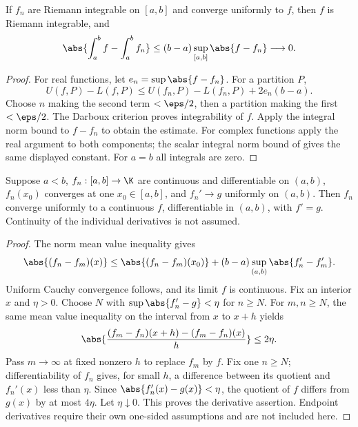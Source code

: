 \begin{theorem}
If $f_n$ are Riemann integrable on $[a,b]$ and converge uniformly to $f$, then $f$ is Riemann integrable, and
\[\abs{\int_a^b f-\int_a^b f_n}\leq(b-a)\sup_{[a,b]}\abs{f-f_n}\longrightarrow0.\]
\end{theorem}
\begin{proof}
For real functions, let $e_n=\sup\abs{f-f_n}$. For a partition $P$,
\[U(f,P)-L(f,P)\leq U(f_n,P)-L(f_n,P)+2e_n(b-a).\]
Choose $n$ making the second term $<\eps/2$, then a partition making the first $<\eps/2$. The Darboux criterion proves integrability of $f$. Apply the integral norm bound to $f-f_n$ to obtain the estimate. For complex functions apply the real argument to both components; the scalar integral norm bound of  gives the same displayed constant. For $a=b$ all integrals are zero.
\end{proof}

\begin{theorem}
Suppose $a<b$, $f_n:[a,b]\to\K$ are continuous and differentiable on $(a,b)$, $f_n(x_0)$ converges at one $x_0\in[a,b]$, and $f_n'\to g$ uniformly on $(a,b)$. Then $f_n$ converge uniformly to a continuous $f$, differentiable in $(a,b)$, with $f'=g$. Continuity of the individual derivatives is not assumed.
\end{theorem}
\begin{proof}
The norm mean value inequality  gives
\[\abs{(f_n-f_m)(x)}\leq\abs{(f_n-f_m)(x_0)}+(b-a)\sup_{(a,b)}\abs{f_n'-f_m'}.\]
Uniform Cauchy convergence follows, and its limit $f$ is continuous. Fix an interior $x$ and $\eta>0$. Choose $N$ with $\sup\abs{f_n'-g}<\eta$ for $n\geq N$. For $m,n\geq N$, the same mean value inequality on the interval from $x$ to $x+h$ yields
\[\abs{\frac{(f_m-f_n)(x+h)-(f_m-f_n)(x)}h}\leq2\eta.\]
Pass $m\to\infty$ at fixed nonzero $h$ to replace $f_m$ by $f$. Fix one $n\geq N$; differentiability of $f_n$ gives, for small $h$, a difference between its quotient and $f_n'(x)$ less than $\eta$. Since $\abs{f_n'(x)-g(x)}<\eta$, the quotient of $f$ differs from $g(x)$ by at most $4\eta$. Let $\eta\downarrow0$. This proves the derivative assertion. Endpoint derivatives require their own one-sided assumptions and are not included here.
\end{proof}

